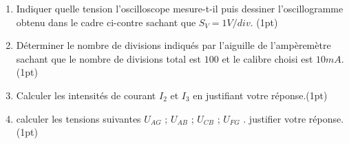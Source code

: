 \documentclass[12pt]{article}
\begin{document}
\begin{enumerate}
	\item Indiquer quelle tension l’oscilloscope mesure-t-il puis dessiner l'oscillogramme obtenu dans le cadre
ci-contre sachant que $S_V = 1 V / div$. \dotfill (1pt)
\item Déterminer le nombre de divisions indiqués par l’aiguille de l’ampèremètre sachant que le nombre de
divisions total est $100$ et le calibre choisi est $10 mA$.\dotfill (1pt)

\item Calculer les intensités de courant $I_2$ et $I_3$ en justifiant votre réponse.\dotfill(1pt)

\item calculer les tensions suivantes $U_{AG}$ ; $U_{AB}$ ; $U_{CB}$ ; $U_{FG}$ . justifier votre réponse. \dotfill(1pt)
\end{enumerate}
\end{document}

